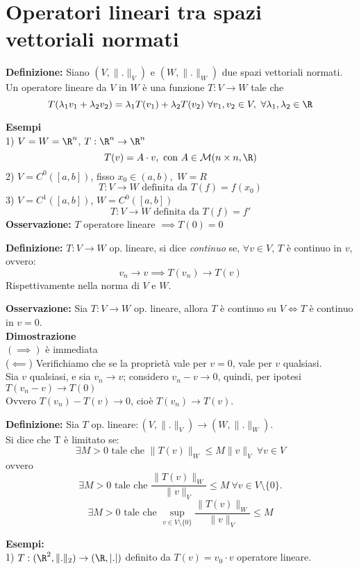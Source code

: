 
\section{Operatori lineari tra spazi vettoriali normati}
\begin{tcolorbox}
\textbf{Definizione: }Siano $(V,\|.\|_V)$ e $(W,\|.\|_W)$ due spazi vettoriali normati.
\\Un operatore lineare da $V$ in $W$ è una funzione  $T:V\to W$ tale che
\[T(\lambda_1v_1+\lambda_2v_2)=\lambda_1T(v_1)+\lambda_2T(v_2) \ \forall v_1,v_2\in V,\  \forall \lambda_1,\lambda_2\in \R\]
\end{tcolorbox}
\textbf{Esempi} 
\\1) $V=W=\R^n$, $T:\R^n\to \R^n$ 
\[T(v)=A\cdot v,\text{ con }A\in \mathcal M (n\times n,\R)\]
2) $V=C^0([a,b])$, fisso $x_0\in (a,b),$ $W=R$
\[T:V\to W\text{ definita da }T(f)=f(x_0)\]
3) $V=C^1([a,b])$, $W=C^0([a,b])$
\[T:V \to W\text{ definita da }T(f)=f'\]
\textbf{Osservazione:} $T$ operatore lineare $\implies T(0)=0$
\begin{tcolorbox}
\textbf{Definizione: } $T:V\to W$ op. lineare, si dice \emph{continuo} se, $\forall v\in V$, $T$ è continuo in $v$, ovvero:
\[v_n \to v\implies T(v_n)\to T(v)\]
Rispettivamente nella norma di $V$ e $W$.
\end{tcolorbox}
\textbf{Osservazione: }Sia $T:V\to W$ op. lineare, allora $T$ è continuo su $V\iff T$ è continuo in $v=0$.
\\\textbf{Dimostrazione} 
\\$(\implies)$ è immediata 
\\($\impliedby$) Verifichiamo che se la proprietà vale per $v=0$, vale per $v$ qualsiasi.
\\Sia $v$ qualsiasi, e sia $v_n\to v$; considero $v_n-v\to 0$, quindi, per ipotesi $T(v_n-v)\to T(0)$
\\Ovvero $T(v_n)- T(v)\to 0$, cioè $T(v_n)\to T(v)$.
\\\divider
\begin{tcolorbox}
	\textbf{Definizione: } Sia $T$ op. lineare$:(V,\|.\|_V)\to (W,\|.\|_W)$.
	\\Si dice che T è limitato se:
	\[\exists  M>0\text{ tale che }\|T(v)\|_W\le M\|v\|_V\ \forall v\in V\]
	ovvero
	\[\exists  M>0 \text{ tale che } \frac{\|T(v)\|_W}{\|v\|_V}\le M\ \forall v\in V\setminus\{0\}.\]
	\[\exists  M>0 \text{ tale che } \sup_{v\in V\setminus \{0\} }\frac{\|T(v)\|_W}{\|v\|_V}\le M\]
\end{tcolorbox}
\textbf{Esempi:} 
\\1) $T:(\R^2,\|.\|_2)\to (\R,|.|)$ definito da $T(v)=v_0\cdot v$ operatore lineare.
